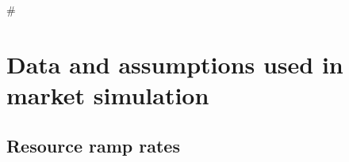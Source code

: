 \documentclass[12pt,a4paper,]{report}
\begin{document}
\appendix

\#

\renewcommand\thefigure{\thesection.\arabic{figure}} 
\renewcommand\thetable{\thesection.\arabic{table}}

\hypertarget{data-and-assumptions-used-in-market-simulation}{%
\chapter{Data and assumptions used in market
simulation}\label{data-and-assumptions-used-in-market-simulation}}

\hypertarget{resource-ramp-rates}{%
\section{Resource ramp rates}\label{resource-ramp-rates}}
\end{document}
